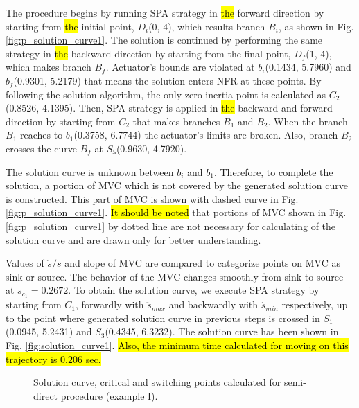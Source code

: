 \documentclass{rob}%
\begin{document}
The procedure begins by running SPA strategy in \hl{the} forward direction by starting from \hl{the} initial point, $ D_i $(0, 4), which results branch $ B_i $, as shown in Fig. \ref{fig:p_solution_curve1}. The solution is continued by performing the same strategy in \hl{the} backward direction by starting from the final point, $ D_f $(1, 4), which makes branch $ B_f $. 
Actuator's bounds are violated at $ b_i $(0.1434, 5.7960) and $ b_f $(0.9301, 5.2179) that means the solution enters NFR at these points.
By following the solution algorithm, the only zero-inertia point is calculated as $ C_2 $(0.8526, 4.1395). 
Then, SPA strategy is applied in \hl{the} backward and forward direction by starting from $ C_2 $ that makes branches $ B_1 $ and $ B_2 $. %
When the branch $ B_1 $ reaches to $ b_1 $(0.3758, 6.7744) the actuator's limits are broken. Also, branch $ B_2 $ crosses the curve $ B_f $ at $ S_5 $(0.9630, 4.7920). 

The solution curve is unknown between $ b_i $ and $ b_1 $. Therefore, to complete the solution, a portion of MVC which is not covered by the generated solution curve is constructed. This part of MVC is shown with dashed curve in Fig. \ref{fig:p_solution_curve1}.
\hl{It should be noted} that portions of MVC shown in Fig. \ref{fig:p_solution_curve1} by dotted line are not necessary for calculating of the solution curve and are drawn only for better understanding.

Values of $ \ddot s / \dot s $ and slope of MVC are compared
to categorize points on MVC as sink or source.
The behavior of the MVC changes smoothly from sink to source at $ s_{c_1} = 0.2672 $. 
To obtain the solution curve, we execute SPA strategy by starting from $ C_1 $, forwardly with $ \ddot s_{max} $ and backwardly with $ \ddot s_{min} $ respectively, up to the point where generated solution curve in previous steps is crossed in $ S_1 $(0.0945, 5.2431) and $ S_3 $(0.4345, 6.3232).
The solution curve has been shown in Fig. \ref{fig:solution_curve1}. \hl{Also, the minimum time calculated for moving on this trajectory is $ 0.206 $ sec.}


\begin{figure}[!t]
	\centering
	\hfil
	\caption{Solution curve, critical and switching points calculated for semi-direct procedure (example I).}
\end{figure}
\end{document}
